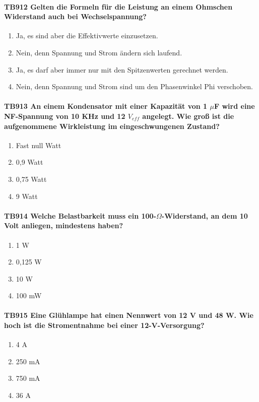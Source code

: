 \documentclass[8pt]{article}
\begin{document}
\begin{enumerate}
\begin{enumerate}[nolistsep,label=\Alph*]
\paragraph*{TB912 Gelten die Formeln für die Leistung an einem Ohmschen Widerstand auch bei Wechselspannung?}
\begin{enumerate}[nolistsep,label=\Alph*]
\item Ja, es sind aber die Effektivwerte einzusetzen. 
\item Nein, denn Spannung und Strom ändern sich laufend.
\item Ja, es darf aber immer nur mit den Spitzenwerten gerechnet werden.
\item Nein, denn Spannung und Strom sind um den Phasenwinkel Phi verschoben.
\end{enumerate}

\paragraph*{TB913 An einem Kondensator mit einer Kapazität von 1 $\mu$F wird eine NF-Spannung von 10 KHz und 12 $V_{eff}$ angelegt. Wie groß ist die aufgenommene Wirkleistung im eingeschwungenen Zustand?}
\begin{enumerate}[nolistsep,label=\Alph*]
\item Fast null Watt
\item 0,9 Watt
\item 0,75 Watt
\item 9 Watt
\end{enumerate}

\paragraph*{TB914 Welche Belastbarkeit muss ein 100-$\Omega$-Widerstand, an dem 10 Volt anliegen, mindestens haben?}
\begin{enumerate}[nolistsep,label=\Alph*]
\item 1 W
\item 0,125 W
\item 10 W
\item 100 mW
\end{enumerate}

\paragraph*{TB915 Eine Glühlampe hat einen Nennwert von 12 V und 48 W. Wie hoch ist die Stromentnahme bei einer 12-V-Versorgung?}
\begin{enumerate}[nolistsep,label=\Alph*]
\item 4 A
\item 250 mA
\item 750 mA
\item 36 A
\end{enumerate}


\end{enumerate}
\end{enumerate}
\end{document}
